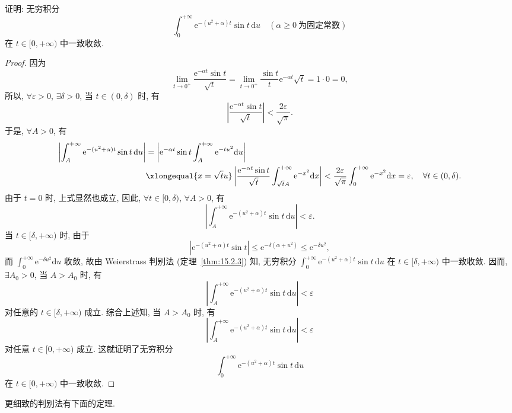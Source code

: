 \begin{example}\label{ex:15.2.4}
证明: 无穷积分
\[
  \int_{0}^{+\infty}\mathrm{e}^{-(u^{2}+\alpha)t}\sin t\,\mathrm{d}u\quad(\alpha\geqslant0\ \text{为固定常数})
\]
在 $t\in[0,+\infty)$ 中一致收敛.
\end{example}

\begin{proof}
因为
\[
  \lim_{t\to0^{+}}\frac{\mathrm{e}^{-\alpha t}\sin t}{\sqrt{t}}=\lim_{t\to0^{+}}\frac{\sin t}{t}\mathrm{e}^{-\alpha t}\sqrt{t}=1\cdot0=0,
\]
所以, $\forall\varepsilon>0$, $\exists\delta>0$, 当 $t\in(0,\delta)$ 时, 有
\[
  \left|\frac{\mathrm{e}^{-\alpha t}\sin t}{\sqrt{t}}\right|<\frac{2\varepsilon}{\sqrt{\pi}}.
\]
于是, $\forall A>0$, 有
\[
  \begin{aligned}
    \left|\int_{A}^{+\infty}\mathrm{e}^{-(u^{2}+\alpha)t}\sin t\,\mathrm{d}u\right|&=\left|\mathrm{e}^{-\alpha t}\sin t\int_{A}^{+\infty}\mathrm{e}^{-tu^{2}}\mathrm{d}u\right|\\
    &\xlongequal{x=\sqrt{t}u}\left|\frac{\mathrm{e}^{-\alpha t}\sin t}{\sqrt{t}}\int_{\sqrt{t}A}^{+\infty}\mathrm{e}^{-x^{2}}\mathrm{d}x\right|<\frac{2\varepsilon}{\sqrt{\pi}}\int_{0}^{+\infty}\mathrm{e}^{-x^{2}}\mathrm{d}x=\varepsilon,\quad\forall t\in(0,\delta).
  \end{aligned}
\]
由于 $t=0$ 时, 上式显然也成立, 因此, $\forall t\in[0,\delta)$, $\forall A>0$, 有
\[
  \left|\int_{A}^{+\infty}\mathrm{e}^{-(u^{2}+\alpha)t}\sin t\,\mathrm{d}u\right|<\varepsilon.
\]
当 $t\in[\delta,+\infty)$ 时, 由于
\[
  \left|\mathrm{e}^{-(u^{2}+\alpha)t}\sin t\right|\leqslant\mathrm{e}^{-\delta(\alpha+u^{2})}\leqslant\mathrm{e}^{-\delta u^{2}},
\]
而 $\displaystyle\int_{0}^{+\infty}\mathrm{e}^{-\delta u^{2}}\mathrm{d}u$ 收敛, 故由 Weierstrass 判别法 (定理~\ref{thm:15.2.3}) 知, 无穷积分 $\displaystyle\int_{0}^{+\infty}\mathrm{e}^{-(u^{2}+\alpha)t}\sin t\,\mathrm{d}u$ 在 $t\in[\delta,+\infty)$ 中一致收敛. 因而, $\exists A_{0}>0$, 当 $A>A_{0}$ 时, 有
\[
  \left|\int_{A}^{+\infty}\mathrm{e}^{-(u^{2}+\alpha)t}\sin t\,\mathrm{d}u\right|<\varepsilon
\]
对任意的 $t\in[\delta,+\infty)$ 成立. 综合上述知, 当 $A>A_{0}$ 时, 有
\[
  \left|\int_{A}^{+\infty}\mathrm{e}^{-(u^{2}+\alpha)t}\sin t\,\mathrm{d}u\right|<\varepsilon
\]
对任意 $t\in[0,+\infty)$ 成立. 这就证明了无穷积分
\[
  \int_{0}^{+\infty}\mathrm{e}^{-(u^{2}+\alpha)t}\sin t\,\mathrm{d}u
\]
在 $t\in[0,+\infty)$ 中一致收敛.
\end{proof}

更细致的判别法有下面的定理.

